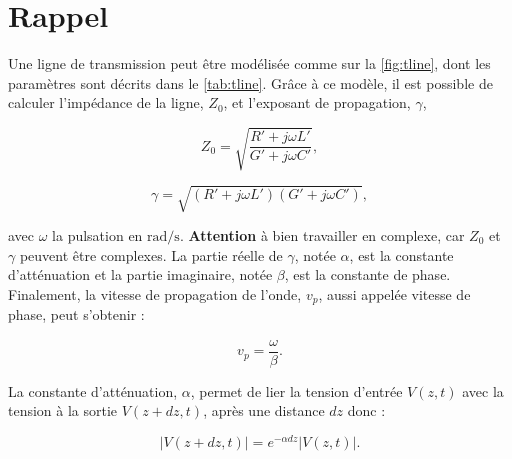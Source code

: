 \documentclass [a4paper, 11pt] {article}
\begin{document}
    \makeseancetitle
    \thispagestyle{firstpage}
    
    \part*{Rappel}
    
    Une ligne de transmission peut être modélisée comme sur la \autoref{fig:tline}, dont les paramètres sont décrits dans le \autoref{tab:tline}. Grâce à ce modèle, il est possible de calculer l'impédance de la ligne, $Z_0$, et l'exposant de propagation, $\gamma$,
    
    \vspace{.5cm}
    
    \noindent
    \begin{minipage}{.5\linewidth}
        \begin{equation}\label{eq:impedance}
            Z_0 = \sqrt{\frac{R' + j \omega L'}{G' + j \omega C'}},
        \end{equation}
    \end{minipage}%
    \begin{minipage}{.5\linewidth}
        \begin{equation}
            \gamma = \sqrt{(R' + j \omega L')(G' + j \omega C')},
        \end{equation}
    \end{minipage}
    
    \vspace{.5cm}
    
    \noindent
    avec $\omega$ la pulsation en $\si{\radian\per\second}$. \textbf{Attention} à bien travailler en complexe, car $Z_0$ et $\gamma$ peuvent être complexes. La partie réelle de $\gamma$, notée $\alpha$, est la constante d'atténuation et la partie imaginaire, notée $\beta$, est la constante de phase. Finalement, la vitesse de propagation de l'onde, $v_p$, aussi appelée vitesse de phase, peut s'obtenir :
    
    \begin{equation}
        v_p = \frac{\omega}{\beta}.
    \end{equation}
    
    La constante d'atténuation, $\alpha$, permet de lier la tension d'entrée $V(z,t)$ avec la tension à la sortie $V(z+dz,t)$, après une distance $dz$ donc :
    
    \begin{equation}
        |V(z+dz,t)| = e^{-\alpha dz} |V(z,t)|.
    \end{equation}
    
\end{document}
